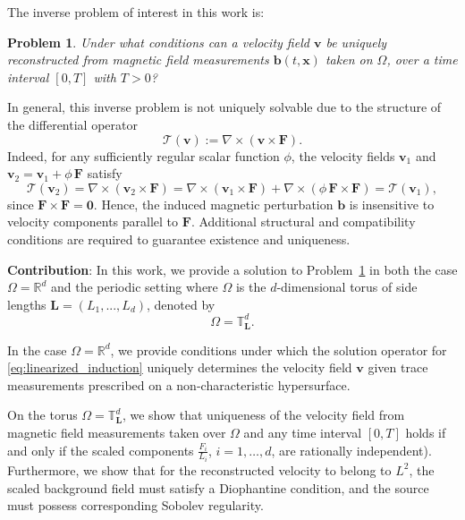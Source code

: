 \documentclass[12pt]{article}
\newtheorem{problem}{Problem}
\begin{document}
		
		
		
		
		The inverse problem of interest in this work is:
		
		\begin{problem}
			\label{problem:inverse}  Under what conditions can a velocity field $\boldsymbol{v}$ be uniquely reconstructed from magnetic  field measurements  \( \boldsymbol{b}(t,\boldsymbol{x}) \)  taken on $\Omega $, over a time interval $[0,T]$ with $T>0$?
			
		\end{problem}
		
		
In general, this inverse problem is not uniquely solvable due to the structure of the differential operator
\[
{{} \mathcal{T}(\boldsymbol{v}) := \nabla \times (\boldsymbol{v}\times \mathbf{F} ).}
\]
Indeed, for any sufficiently regular scalar function $\phi$, the velocity fields 
$\boldsymbol{v}_1$ and $\boldsymbol{v}_2 = \boldsymbol{v}_1 + \phi\,\mathbf{F}$ satisfy
{{} \[
\mathcal{T}(\boldsymbol{v}_2)
= \nabla \times (\boldsymbol{v}_2\times \mathbf{F} )
= \nabla \times (\boldsymbol{v}_1\times \mathbf{F} )
  + \nabla \times (\phi\,\mathbf{F} \times \mathbf{F})
= \mathcal{T}(\boldsymbol{v}_1),
\]}
since $\mathbf{F} \times \mathbf{F} = \mathbf{0}$. 
Hence, the induced magnetic perturbation $\boldsymbol{b}$ is insensitive to velocity components parallel to $\mathbf{F}$. Additional structural and compatibility conditions are required to guarantee existence and uniqueness. 


		
		\textbf{Contribution}: In this work, we provide a solution to Problem~\ref{problem:inverse} in both the case $\Omega = \mathbb{R}^d$ and the periodic setting where $\Omega$ is the $d$-dimensional torus of side lengths $\boldsymbol{L}=(L_1, ..., L_d)$, denoted by
	\begin{equation*}
		\Omega =\mathbb{T}^d_{\boldsymbol{L}}.\label{eq:periodic_domain}
	\end{equation*}
    

   In the case $\Omega = \mathbb{R}^d$, we provide conditions under which the solution operator for \eqref{eq:linearized_induction} uniquely determines the velocity field $\boldsymbol{v}$ given trace measurements prescribed on a non-characteristic hypersurface.
    
    On the torus $\Omega = \mathbb{T}_{\boldsymbol{L}}^d$, we show that uniqueness of the velocity field from magnetic field measurements taken over \( \Omega \) and any time interval \( [0,T] \) holds if and only if the scaled components \( \frac{F_i}{L_i} \), \( i=1,\dots,d \), are rationally independent). Furthermore, we show that for the reconstructed velocity to belong to $L^2$, the scaled background field must satisfy a Diophantine condition, and the source must possess corresponding Sobolev regularity.
		
\end{document}
